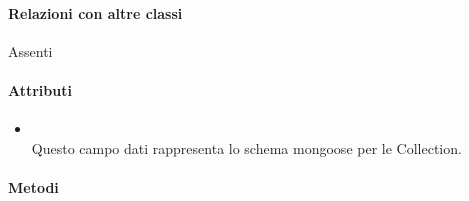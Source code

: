 \paragraph*{Relazioni con altre classi}
Assenti

\paragraph*{Attributi}
\begin{itemize}
\item[]  \\ Questo campo dati rappresenta lo schema mongoose per le Collection.
\end{itemize}

\paragraph*{Metodi}
